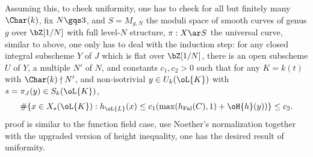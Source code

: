 \documentclass[a4paper, twoside]{article}
\begin{document}
Assuming this, to check uniformity, one has to check for all but finitely many $\Char(k)$, fix $N\gqs3$, and $S=M_{g,N}$ the moduli space of smooth curves of genus $g$ over $\bZ[1/N]$ with full level-$N$ structure, $\pi:X\ar S$ the universal curve, similar to above, one only has to deal with the induction step: for any closed integral subscheme $Y$ of $J$ which is flat over $\bZ[1/N]$, there is an open subscheme $U$ of $Y$, a multiple $N'$ of $N$, and constants $c_{1},c_{2}>0$ such that for any $K=k(t)$ with $\Char(k)\nmid N'$, and non-isotrivial $y\in U_{k}(\oL{K})$ with $s=\pi_{J}(y)\in S_{k}(\oL{K})$,
\[
	\#\{x\in X_{s}(\oL{K}):h_{\oL{L}}(x)\leq c_{1}(\max(h_{\mathrm{Fal}}(C),1)+\oH{h}(y))\}\leq c_{2}.
\]
proof is similar to the function field case, use Noether's normalization together with the upgraded version of height inequality, one has the desired result of uniformity.







\end{document}
